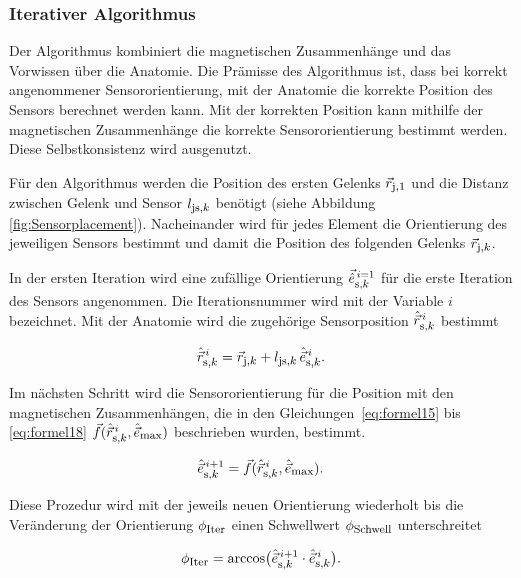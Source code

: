\subsubsection{Iterativer Algorithmus}

Der Algorithmus kombiniert die magnetischen Zusammenhänge und das Vorwissen über die Anatomie. Die Prämisse des Algorithmus ist, dass bei korrekt angenommener Sensororientierung, mit der Anatomie die korrekte Position des Sensors berechnet werden kann. Mit der korrekten Position kann mithilfe der magnetischen Zusammenhänge die korrekte Sensororientierung bestimmt werden. Diese Selbstkonsistenz wird ausgenutzt.

Für den Algorithmus werden die Position des ersten Gelenks $\vec{r}_{\textrm{\footnotesize{j,1}}}$ und die Distanz zwischen Gelenk und Sensor $l_{\textrm{\footnotesize{js,$k$}}}$ benötigt (siehe Abbildung\,\ref{fig:Sensorplacement}). Nacheinander wird für jedes Element die Orientierung des jeweiligen Sensors bestimmt und damit die Position des folgenden Gelenks $\vec{r}_{\textrm{\footnotesize{j,$k$}}}$. 
    
In der ersten Iteration wird eine zufällige Orientierung $\vec{\hat{e}}_{\textrm{\footnotesize{s,$k$}}}^{\,i=1}$ für die erste Iteration des Sensors angenommen. Die Iterationsnummer wird mit der Variable $i$ bezeichnet.  Mit der Anatomie wird die zugehörige Sensorposition $\hat{\vec{r}}_{\textrm{\footnotesize{s,$k$}}}^{\,i}$ bestimmt

    \begin{equation}
        \hat{\vec{r}}_{\textrm{\footnotesize{s,$k$}}}^{\,i} = \vec{r}_{\textrm{\footnotesize{j,$k$}}} + l_{\textrm{\footnotesize{js,$k$}}} \, \hat{\vec{e}}_{\textrm{\footnotesize{s,$k$}}}^{\,i} .
        \label{eq:formelIter1}
    \end{equation}
    
    Im nächsten Schritt wird die Sensororientierung für die Position mit den magnetischen Zusammenhängen, die in den Gleichungen \,\ref{eq:formel15} bis \ref{eq:formel18} $\vec{f}(\hat{\vec{r}}_{\textrm{\footnotesize{s,$k$}}}^{\,i},\hat{\vec{e}}_{\textrm{\footnotesize{max}}})$ beschrieben wurden, bestimmt.

\begin{equation}
    \hat{\vec{e}}_{\textrm{\footnotesize{s,$k$}}}^{\,i+1} = \vec{f}(\hat{\vec{r}}_{\textrm{\footnotesize{s,$k$}}}^{\,i},\hat{\vec{e}}_{\textrm{\footnotesize{max}}}).
    \label{eq:formelIter2}
\end{equation} 
    
Diese Prozedur wird mit der jeweils neuen Orientierung wiederholt bis die Veränderung der Orientierung $\phi_{\textrm{\footnotesize{Iter}}}$ einen Schwellwert $\phi_{\textrm{\footnotesize{Schwell}}}$ unterschreitet 
    
\begin{equation}
    \phi_{\textrm{\footnotesize{Iter}}} = \arccos\bigl(\hat{\vec{e}}_{\textrm{\footnotesize{s,$k$}}}^{\,i+1} \cdot \hat{\vec{e}}_{\textrm{\footnotesize{s,$k$}}}^{\,i}\bigr).
\end{equation}
    
